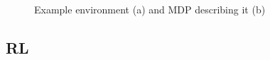 \begin{figure}[!htb]
    \centering
    \begin{minipage}[t]{0.34\textwidth}
        \centering
        \label{fig:gridworld}
    \end{minipage}
    \begin{minipage}[t]{0.6\textwidth}
        \centering
        \label{fig:gridworldMDP}
    \end{minipage}
    \caption{Example environment (a) and MDP describing it (b)}
    \label{fig:MDP}
\end{figure}



\subsection{RL}



